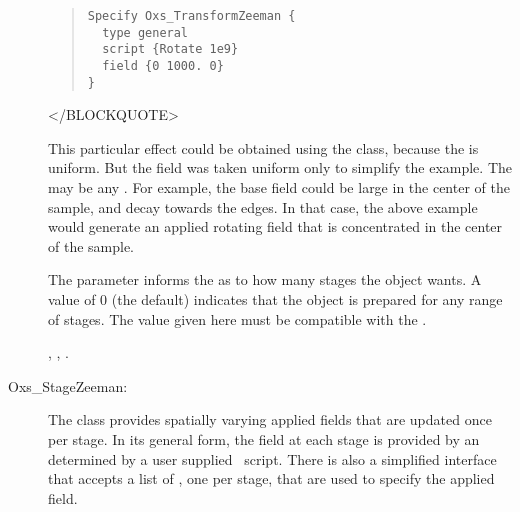 \begin{description}
\begin{quote}
\begin{verbatim}
Specify Oxs_TransformZeeman {
  type general
  script {Rotate 1e9}
  field {0 1000. 0}
}
\end{verbatim}
\end{quote}
\begin{rawhtml}
</BLOCKQUOTE>
\end{rawhtml}
This particular effect could be obtained using the
 class, because the  is uniform.
But the field was taken uniform only to simplify the example.  The
 may be any .  For
example, the base field could be large in the center of the sample, and
decay towards the edges.  In that case, the above example would generate
an applied rotating field that is concentrated in the center of the
sample.

The  parameter informs the
 as to how many stages the
 object wants.  A value of 0 (the default)
indicates that the object is prepared for any range of stages.  The
 value given here must be compatible with the
.

\begin{ExampleMifs}
  , , .
\end{ExampleMifs}

%
\item[Oxs\_StageZeeman:]
   The  class provides spatially varying applied
   fields that are updated once per stage.  In its general form, the
   field at each stage is provided by an 
   determined by a user supplied \Tcl\ script.  There is also a
   simplified interface that accepts a list of , one per
   stage, that are used to specify the applied field.


\end{description}
